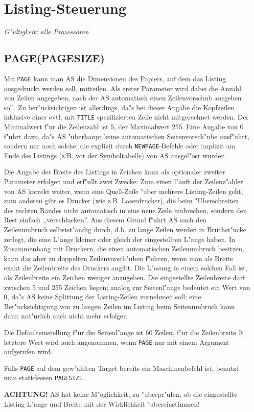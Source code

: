 \documentclass[12pt,a4paper,twoside]{report}
\makeatletter
\newcommand{\bb}[1]{{\bf #1}}
\newcommand{\tty}[1]{{\tt #1}}
\newcommand{\ttindex}[1]{\index{#1@{\tt #1}}}
\makeatother
\begin{document}

\section{Listing-Steuerung}

{\em G"ultigkeit: alle Prozessoren}


\subsection{PAGE(PAGESIZE)}
\ttindex{PAGE}\ttindex{PAGESIZE}

Mit \tty{PAGE} kann man AS die Dimensionen des Papiers, auf dem das
Listing ausgedruckt werden soll, mitteilen.  Als erster Parameter
wird dabei die Anzahl von Zeilen angegeben, nach der AS automatisch
einen Zeilenvorschub ausgeben soll.  Zu ber"ucksichtigen ist allerdings,
da"s bei dieser Angabe die Kopfzeilen inklusive einer evtl. mit \tty{TITLE}
spezifizierten Zeile nicht mitgerechnet werden.  Der Minimalwert f"ur
die Zeilenzahl ist 5, der Maximalwert 255.  Eine Angabe von 0 f"uhrt dazu,
da"s AS "uberhaupt keine automatischen Seitenvorsch"ube ausf"uhrt, sondern
nur noch solche, die explizit durch \tty{NEWPAGE}-Befehle oder implizit am
Ende des Listings (z.B. vor der Symboltabelle) von AS ausgel"ost
wurden.
\par
Die Angabe der Breite des Listings in Zeichen kann als optionaler
zweiter Parameter erfolgen und erf"ullt zwei Zwecke: Zum einen l"auft
der Zeilenz"ahler von AS korrekt weiter, wenn eine Quell-Zeile "uber mehrere
Listing-Zeilen geht, zum anderen gibt es Drucker (wie z.B. Laserdrucker),
die beim "Uberschreiten des rechten Randes nicht automatisch in eine neue
Zeile umbrechen, sondern den Rest einfach ,,verschlucken''.  Aus diesem
Grund f"uhrt AS auch den Zeilenumbruch selbstst"andig durch, d.h. zu lange
Zeilen werden in Bruchst"ucke zerlegt, die eine L"ange kleiner oder
gleich der eingestellten L"ange haben.  In Zusammenhang mit Druckern, die
einen automatischen Zeilenumbruch besitzen, kann das aber zu doppelten
Zeilenvorsch"uben f"uhren, wenn man als Breite exakt die Zeilenbreite des
Druckers angibt.  Die L"osung in einem solchen Fall ist, als Zeilenbreite
ein Zeichen weniger anzugeben.  Die eingestellte Zeilenbreite darf zwischen
5 und 255 Zeichen liegen; analog zur Seitenl"ange bedeutet ein Wert von 0,
da"s AS keine Splittung der Listing-Zeilen vornehmen soll; eine
Ber"ucksichtigung von zu langen Zeilen im Listing beim Seitenumbruch kann
dann nat"urlich auch nicht mehr erfolgen.
\par
Die Defaulteinstellung f"ur die Seitenl"ange ist 60 Zeilen, f"ur die
Zeilenbreite 0; letztere Wert wird auch angenommen, wenn \tty{PAGE} nur mit
einem Argument aufgerufen wird.
\par
Falls \tty{PAGE} auf dem gew"ahlten Target bereits ein
Maschinenbefehl ist, benutzt man stattdessen \tty{PAGESIZE}.
\par
\bb{ACHTUNG!} AS hat keine M"oglichkeit, zu "uberpr"ufen, ob die
eingestellte Listing-L"ange und Breite mit der Wirklichkeit "ubereinstimmen!
\end{document}
